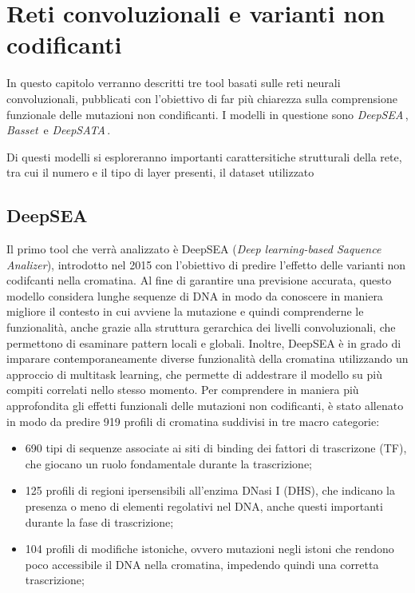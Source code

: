 \chapter{Reti convoluzionali e varianti non codificanti}\label{chp:CNN-non-coding-variants}

In questo capitolo verranno descritti tre tool basati sulle reti neurali convoluzionali, pubblicati con l'obiettivo di far più chiarezza sulla comprensione funzionale delle mutazioni non condificanti. I modelli in questione sono \textsl{DeepSEA}\,\cite[``Predicting effects of noncoding variants with deep learning--based sequence model'']{zhou2015predicting}, \textsl{Basset}\,\cite[``Basset: learning the regulatory code of the accessible genome with deep convolutional neural networks'']{kelley2016basset} e \textsl{DeepSATA}\,\cite[``DeepSATA: A Deep Learning-Based Sequence Analyzer Incorporating the Transcription Factor Binding Affinity to Dissect the Effects of Non-Coding Genetic Variants'']{ma2023deepsata}.

Di questi modelli si esploreranno importanti carattersitiche strutturali della rete, tra cui il numero e il tipo di layer presenti, il dataset utilizzato



\section{DeepSEA}\label{sec:DeepSEA}
% 
Il primo tool che verrà analizzato è DeepSEA (\textit{Deep learning-based Saquence Analizer}), introdotto nel 2015 con l'obiettivo di predire l'effetto delle varianti non codifcanti nella cromatina. Al fine di garantire una previsione accurata, questo modello considera lunghe sequenze di \acs{DNA} in modo da conoscere in maniera migliore il contesto in cui avviene la mutazione e quindi comprenderne le funzionalità, anche grazie alla struttura gerarchica dei livelli convoluzionali, che permettono di esaminare pattern locali e globali. 
Inoltre, DeepSEA è in grado di imparare contemporaneamente diverse funzionalità della cromatina utilizzando un approccio di multitask learning, che permette di addestrare il modello su più compiti correlati nello stesso momento. Per comprendere in maniera più approfondita gli effetti funzionali delle mutazioni non codificanti, è stato allenato in modo da predire 919 profili di cromatina suddivisi in tre macro categorie:
% 
\begin{itemize}
    \item 690 tipi di sequenze associate ai siti di binding dei fattori di trascrizone (\acs{TF}), che giocano un ruolo fondamentale durante la trascrizione;
    \item 125 profili di regioni ipersensibili all'enzima DNasi I (\acs{DHS}), che indicano la presenza o meno di elementi regolativi nel \acs{DNA}, anche questi importanti durante la fase di trascrizione;
    \item 104 profili di modifiche istoniche, ovvero mutazioni negli istoni che rendono poco accessibile il \acs{DNA} nella cromatina, impedendo quindi una corretta trascrizione;
\end{itemize}
% 

